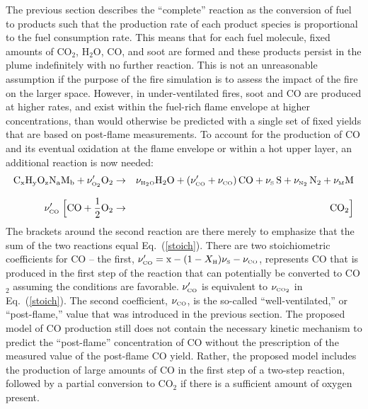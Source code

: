 \documentclass[11pt]{book}
\begin{document}
\label{co_production}

The previous section describes the ``complete'' reaction as the conversion of fuel to
products such that the production rate of each product species is proportional to the fuel consumption rate.
This means that for each fuel molecule, fixed amounts of CO$_2$, H$_2$O, CO, and soot are formed and these products
persist in the plume indefinitely with no further reaction. This is not an unreasonable assumption if
the purpose of the fire simulation is to assess the impact of the fire on the larger space.
However, in under-ventilated fires, soot and CO are produced at higher rates,
and exist within the fuel-rich flame envelope at higher concentrations,
than would otherwise be predicted with a single set of fixed yields that are based on post-flame measurements. To account for the
production of CO and its eventual oxidation at the flame envelope or within a hot upper layer,
an additional reaction is now needed:
\begin{eqnarray}
\mathrm{C_xH_yO_zN_aM_b} +  \nu_{\tiny \hbox{O}_2}' \mathrm{O_2}  &\rightarrow&  \nu_{\tiny \hbox{H}_2\hbox{O}} \mathrm{H_2O} + (\nu_{\tiny \hbox{CO}}'+ \nu_{\tiny \hbox{CO}}) \, \mathrm{CO} +
     \nu_{\tiny \hbox{S}} \, \mathrm{S}  + \nu_{\tiny \hbox{N}_2} \, \mathrm{N_2} + \nu_{\tiny \hbox{M}} \mathrm{M}  \\*[.1in]
\nu_{\tiny \hbox{CO}}' \; \Big[ \mathrm{CO} + \frac{1}{2} \mathrm{O_2}  &\rightarrow&  \mathrm{CO_2}  \Big]
\label{3reac} \end{eqnarray}
The brackets around the second reaction are there merely to emphasize that the sum of the two reactions equal Eq.~(\ref{stoich}).
There are two stoichiometric coefficients for CO -- the first, $\nu_{\tiny \hbox{CO}}'=\hbox{x}-(1-X_{\tiny \hbox{H}}) \nu_{\tiny \hbox{S}}-\nu_{\tiny \hbox{CO}}$,
represents CO that is produced in the first
step of the reaction that can potentially be converted to CO$_2$ assuming the conditions are favorable. $\nu_{\tiny \hbox{CO}}'$ is equivalent to $\nu_{\tiny \hbox{CO}_2}$ in
Eq.~(\ref{stoich}). The second coefficient, $\nu_{\tiny \hbox{CO}}$,
is the so-called ``well-ventilated,'' or ``post-flame,'' value that was introduced in the previous section. The proposed model of CO production
still does not contain the necessary kinetic mechanism to predict the ``post-flame'' concentration of CO without the prescription of the
measured value of the post-flame CO yield. Rather, the proposed model includes the production of large amounts of CO in the first step of a two-step
reaction, followed by a partial conversion to CO$_2$ if there is a sufficient amount of oxygen present.
\end{document}

